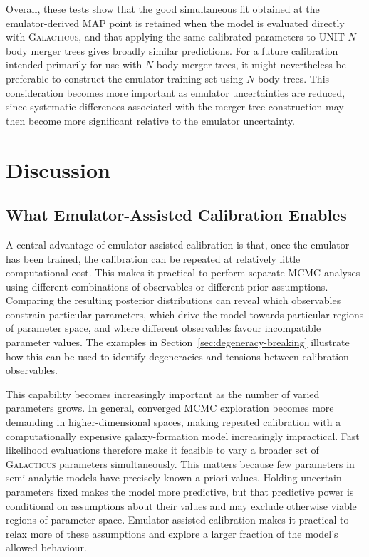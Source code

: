 \documentclass[twocolumn, apj, numberedappendix, iop]{openjournal}
\newcommand{\galacticus}{\textsc{Galacticus}\xspace}
\begin{document}
Overall, these tests show that the good simultaneous fit obtained at the
emulator-derived MAP point is retained when the model is evaluated directly
with \galacticus{}, and that applying the same calibrated parameters to UNIT
\(N\)-body merger trees gives broadly similar predictions. For a future
calibration intended primarily for use with \(N\)-body merger trees, it might
nevertheless be preferable to construct the emulator training set using
\(N\)-body trees. This consideration becomes more important as emulator
uncertainties are reduced, since systematic differences associated with the
merger-tree construction may then become more significant relative to the
emulator uncertainty.



\section{Discussion}
\label{sec:discussion}

\subsection{What Emulator-Assisted Calibration Enables}

A central advantage of emulator-assisted calibration is that, once the
emulator has been trained, the calibration can be repeated at relatively
little computational cost. This makes it practical to perform separate MCMC
analyses using different combinations of observables or different prior assumptions. Comparing the resulting posterior
distributions can reveal which observables constrain particular parameters,
which drive the model towards particular regions of parameter space, and where
different observables favour incompatible parameter values. The examples in
Section~\ref{sec:degeneracy-breaking} illustrate how this can be used to identify degeneracies
and tensions between calibration observables.

This capability becomes increasingly important as the number of varied
parameters grows. In general, converged MCMC exploration becomes more
demanding in higher-dimensional spaces, making repeated calibration with a
computationally expensive galaxy-formation model increasingly impractical.
Fast likelihood evaluations therefore make it feasible to vary a broader set
of \galacticus{} parameters simultaneously. This matters because few
parameters in semi-analytic models have precisely known a priori values.
Holding uncertain parameters fixed makes the model more predictive, but that
predictive power is conditional on assumptions about their values and may
exclude otherwise viable regions of parameter space. Emulator-assisted
calibration makes it practical to relax more of these assumptions and explore
a larger fraction of the model's allowed behaviour.
\end{document}
